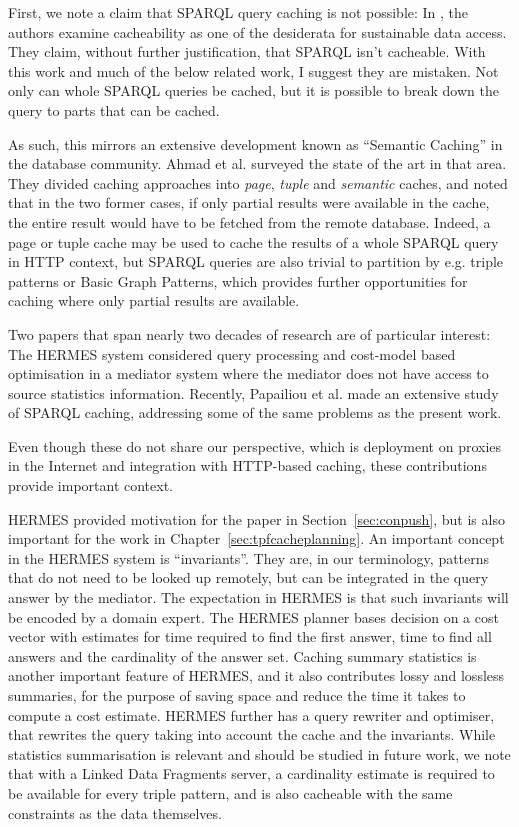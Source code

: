 First, we note a claim that SPARQL query caching is not possible:
In \cite{hogan2014paths}, the authors examine cacheability as one of the
desiderata for sustainable data access. They claim, without further
justification, that SPARQL isn't cacheable. With this work and much of
the below related work, I suggest they are mistaken. Not only can
whole SPARQL queries be cached, but it is possible to break down the
query to parts that can be cached.

As such, this mirrors an extensive development known as ``Semantic
Caching'' in the database community. Ahmad et al. \cite{4777801}
surveyed the state of the art in that area. They divided caching
approaches into \emph{page}, \emph{tuple} and \emph{semantic} caches,
and noted that in the two former cases, if only partial results were
available in the cache, the entire result would have to be fetched
from the remote database. Indeed, a page or tuple cache may be used to
cache the results of a whole SPARQL query in HTTP context, but SPARQL
queries are also trivial to partition by e.g. triple patterns or Basic
Graph Patterns, which provides further opportunities for caching where
only partial results are available.

Two papers that span nearly two decades of research are of particular
interest: The HERMES system \cite{adali1996query} considered query
processing and cost-model based optimisation in a mediator system
where the mediator does not have access to source statistics
information. Recently, Papailiou et al. \cite{papailiou2015graph}
made an extensive study of SPARQL caching, addressing some of the same
problems as the present work.

Even though these do not share our perspective, which is deployment on
proxies in the Internet and integration with HTTP-based caching, these
contributions provide important context. 

HERMES \cite{adali1996query} provided motivation for the paper in
Section~\ref{sec:conpush}, but is also important for the work in
Chapter~\ref{sec:tpfcacheplanning}. An important concept in the HERMES
system is ``invariants''. They are, in our terminology, patterns that
do not need to be looked up remotely, but can be integrated in the
query answer by the mediator. The expectation in HERMES is that such
invariants will be encoded by a domain expert. The HERMES planner
bases decision on a cost vector with estimates for time required to
find the first answer, time to find all answers and the cardinality of
the answer set. Caching summary statistics is another important
feature of HERMES, and it also contributes lossy and lossless
summaries, for the purpose of saving space and reduce the time it
takes to compute a cost estimate. HERMES further has a query rewriter
and optimiser, that rewrites the query taking into account the cache
and the invariants. While statistics summarisation is relevant and should be
studied in future work, we note that with a Linked Data Fragments
server, a cardinality estimate is required to be available for every
triple pattern, and is also cacheable with the same constraints as the
data themselves.

